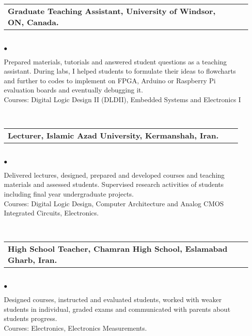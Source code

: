 \begin{tabular}{L{14cm}p{1cm}r} \bf  { Graduate Teaching Assistant, University of Windsor, ON, Canada. }&&\mdseries {}\mdseries  \normalsize  \end{tabular} \\
\phantom \quad $\bullet$ \begin{minipage}[t]{0.965\textwidth}  Prepared materials, tutorials and answered student questions as a teaching assistant. During  labs, I 
helped students to formulate their ideas to flowcharts and further to codes to implement on FPGA, Arduino or Raspberry Pi evaluation boards
 and eventually debugging it.   \\[0.1cm]
 Courses: Digital Logic Design II (DLDII), Embedded Systems and Electronics I
\end{minipage}\\ [0.2cm]
\begin{tabular}{L{12cm}p{3cm}r} \bf  {  Lecturer, Islamic Azad University,  Kermanshah, Iran.} &&\mdseries{}\mdseries  \normalsize \end{tabular}\\
\phantom \quad $\bullet$ \begin{minipage}[t]{0.965\textwidth}  
Delivered lectures, designed, prepared and developed courses and teaching materials and assessed students. Supervised  research activities of students  including final year undergraduate projects.\\ [0.2cm]
Courses: Digital Logic Design, Computer Architecture and Analog CMOS Integrated Circuits, Electronics. 
 \end{minipage} \phantom  \mdseries 
 \\ [0.2cm]
 \begin{tabular}{L{14cm}p{1cm}r} \bf  {  High School Teacher, Chamran High School,  Eslamabad Gharb, Iran.} &&\mdseries{}\mdseries  \normalsize \end{tabular}\\
\phantom \quad $\bullet$ \begin{minipage}[t]{0.965\textwidth}  
Designed courses, instructed and evaluated students, worked  with weaker students in individual,  graded  exams and communicated with parents about students progress.\\ [0.2cm]
Courses: Electronics, Electronics Measurements. 
 \end{minipage} \phantom  \mdseries \\ \\
